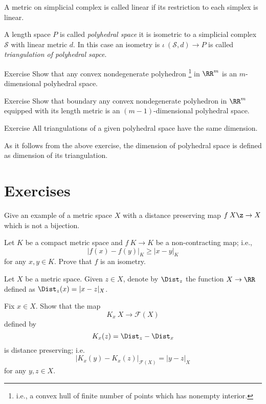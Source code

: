 A metric on simplicial complex is called linear if its restriction to each simplex is linear.

A length space $P$ is called \emph{polyhedral space} it is isometric to a simplicial complex $\mathcal{S}$ with linear metric $d$.
In this case an isometry is $\iota\:(\mathcal{S},d)\to P$ is called \emph{triangulation of polyhedral sapce}.

\begin{thm}{Exercise}
 Show that any convex nondegenerate polyhedron%
\footnote{i.e., a convex hull of finite number of points which has nonempty interior.}
 in $\RR^m$ is an $m$-dimensional polyhedral space.
\end{thm}

\begin{thm}{Exercise}\label{ex:bry-is-poly}
Show that boundary any convex nondegenerate polyhedron%
\footnotemark[\value{footnote}] in $\RR^m$ equipped with its length metric is an $(m-1)$-dimensional polyhedral space.
\end{thm}


\begin{thm}{Exercise}\label{ex:dim-poly}
All triangulations of a given polyhedral space
have the same dimension.
\end{thm}

As it follows from the above exercise,
the dimension of polyhedral space is defined as dimension of its triangulation.







\section*{Exercises}

\begin{pr}\label{pr:nonisometry}
Give an example of a metric space $X$ with a distance preserving map $f\:X\z\to X$ which is not a bijection. 
\end{pr}

\begin{pr}\label{pr:non-contracting=>isometry}
Let $K$  be a compact metric space and
$f\:K\to K$ be a non-contracting map;
i.e., 
$$|f(x)-f(y)|_K\ge |x-y|_K$$
for any $x,y\in K$.
Prove that $f$ is an isometry.
\end{pr}



\begin{pr}\label{ex:kuratowski}
Let $X$ be a metric space.
Given $z\in X$, denote by $\Dist_z$ the function $X\to\RR$ defined as $\Dist_z(x)=|x-z|_X$.

Fix $x\in X$.
Show that the map 
$$K_x\: X\to\mathcal{F}(X)$$ 
defined by 
$$K_x(z) = \Dist_z-\Dist_x$$
is distance preserving;
i.e. 
$$|K_x(y)-K_x(z)|_{\mathcal{F}(X)}=|y-z|_X$$
for any $y,z\in X$.
\end{pr}

